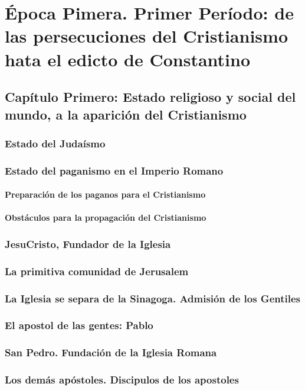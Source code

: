 \raggedbottom{} \documentclass[12pt, a4paper]{book}
\begin{document}
\part{Época Pimera. Primer Período: de las persecuciones del Cristianismo hata el edicto de Constantino}
\chapter{Capítulo Primero: Estado religioso y social del mundo, a la aparición del Cristianismo}
\section{Estado del Judaísmo}
\section{Estado del paganismo en el Imperio Romano}
\subsection{Preparación de los paganos para el Cristianismo}
\subsection{Obstáculos para la propagación del Cristianismo}
\section{JesuCristo, Fundador de la Iglesia}
\section{La primitiva comunidad de Jerusalem}
\section{La Iglesia se separa de la Sinagoga. Admisión de los Gentiles}
\section{El apostol de las gentes: Pablo}
\section{San Pedro. Fundación de la Iglesia Romana}
\section{Los demás apóstoles. Discipulos de los apostoles}
\end{document}
